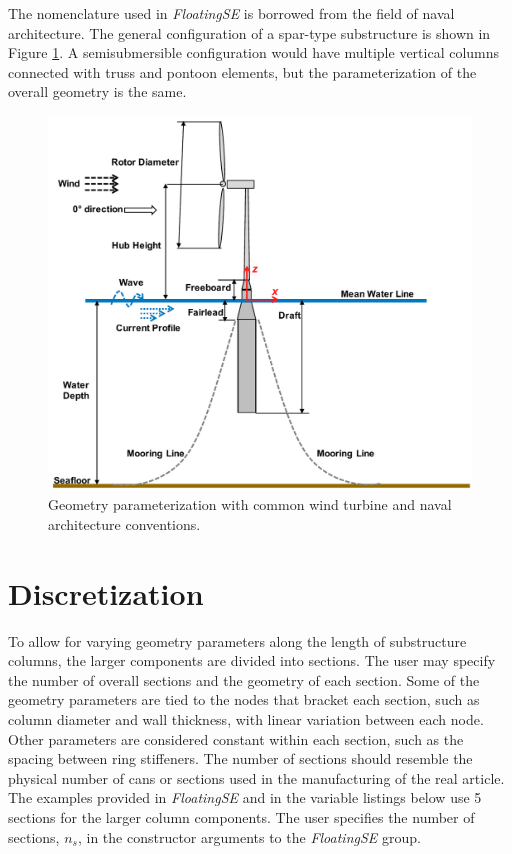 The nomenclature used in \textit{FloatingSE} is borrowed from the field
of naval architecture.  The general configuration of a spar-type
substructure is shown in Figure \ref{fig:diagram}.  A semisubmersible
configuration would have multiple vertical columns connected with
truss and pontoon elements, but the parameterization of the overall
geometry is the same.
\begin{figure}
  \begin{center}
    \includegraphics[width=5in]{figs/diagram.pdf}
    \caption{Geometry parameterization with common wind turbine and
      naval architecture conventions.}
    \label{fig:diagram}
  \end{center}
\end{figure}

\section{Discretization}
To allow for varying geometry parameters along the length of
substructure columns, the larger components are divided into sections.
The user may specify the number of overall sections and the geometry of
each section.  Some of the geometry parameters are tied to the nodes
that bracket each section, such as column diameter and wall thickness,
with linear variation between each node.  Other parameters are
considered constant within each section, such as the spacing between
ring stiffeners.  The number of sections should resemble the physical
number of cans or sections used in the manufacturing of the real
article.  The examples provided in \textit{FloatingSE} and in the variable
listings below use 5 sections for the larger column components.  The
user specifies the number of sections, $n_s$, in the constructor
arguments to the \textit{FloatingSE} group.

